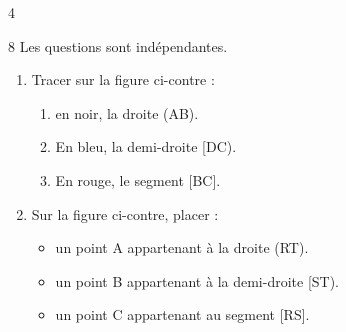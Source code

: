 \documentclass[a4paper]{book}
\begin{document}
{\begin{exerciceNote}{4}
\begin{enumerate}
\begin{minipage}{0.3\linewidth}
                \points[60]
            \end{minipage}
        \end{enumerate}
    \end{exerciceNote}


    \begin{exerciceNote}{8}
        Les questions sont indépendantes.
        \begin{enumerate}
            \item 
            \begin{minipage}{0.3\linewidth}
                Tracer sur la figure ci-contre :
                \begin{enumerate}
                    \item en noir, la droite (AB).
                    \item En bleu, la demi-droite [DC).
                    \item En rouge, le segment [BC].
                \end{enumerate}
            \end{minipage}
            \begin{minipage}{0.49\linewidth}
                \begin{center}
                \end{center}
            \end{minipage}
            \hfill

            \bigskip

            \item 
            \begin{minipage}{0.4\linewidth}
                Sur la figure ci-contre, placer :
                \begin{itemize}
                    \item un point A appartenant à la droite (RT).
                    \item un point B appartenant à la demi-droite [ST).
                    \item un point C appartenant au segment [RS].
                \end{itemize}
            \end{minipage}
            \begin{minipage}{0.49\linewidth}
                \begin{center}
                \end{center}
            \end{minipage}
            \hfill


\end{enumerate}
\end{exerciceNote}}
\end{document}
